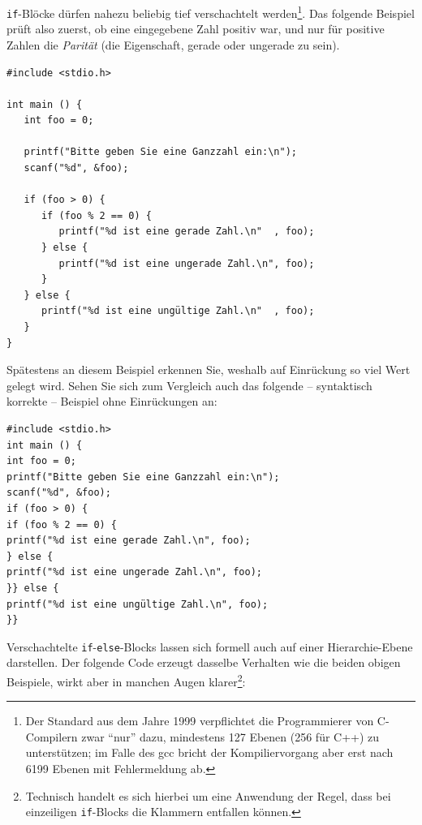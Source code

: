 \texttt{if}-Blöcke dürfen nahezu beliebig tief verschachtelt werden\footnote{Der Standard aus dem Jahre 1999 verpflichtet die Programmierer von C-Compilern zwar \enquote{nur} dazu, mindestens 127 Ebenen (256 für C++) zu unterstützen; im Falle des gcc bricht der Kompiliervorgang aber erst nach 6199 Ebenen mit Fehlermeldung ab.}. Das folgende Beispiel prüft also zuerst, ob eine eingegebene Zahl positiv war, und nur für positive Zahlen die \emph{Parität} (die Eigenschaft, gerade oder ungerade zu sein).

\begin{codebox}
\begin{verbatim}
#include <stdio.h>

int main () {
   int foo = 0;
   
   printf("Bitte geben Sie eine Ganzzahl ein:\n");
   scanf("%d", &foo);

   if (foo > 0) {
      if (foo % 2 == 0) {
         printf("%d ist eine gerade Zahl.\n"  , foo);
      } else {
         printf("%d ist eine ungerade Zahl.\n", foo);
      }
   } else {
      printf("%d ist eine ungültige Zahl.\n"  , foo);
   }
}
\end{verbatim}
\end{codebox}

Spätestens an diesem Beispiel erkennen Sie, weshalb auf Einrückung so viel Wert gelegt wird. Sehen Sie sich zum Vergleich auch das folgende -- syntaktisch korrekte -- Beispiel ohne Einrückungen an:

\begin{warnbox}[Schlechter Stil: Code mit mehreren Hierarchie-Ebenen ohne Einrückungen, leftupper=7mm]
\begin{verbatim}
#include <stdio.h>
int main () {
int foo = 0;
printf("Bitte geben Sie eine Ganzzahl ein:\n");
scanf("%d", &foo);
if (foo > 0) {
if (foo % 2 == 0) {
printf("%d ist eine gerade Zahl.\n", foo);
} else {
printf("%d ist eine ungerade Zahl.\n", foo);
}} else {
printf("%d ist eine ungültige Zahl.\n", foo);
}}
\end{verbatim}
\end{warnbox}

Verschachtelte \texttt{if}-\texttt{else}-Blocks lassen sich formell auch auf einer Hierarchie-Ebene darstellen. Der folgende Code erzeugt dasselbe Verhalten wie die beiden obigen Beispiele, wirkt aber in manchen Augen klarer\footnote{Technisch handelt es sich hierbei um eine Anwendung der Regel, dass bei einzeiligen \texttt{if}-Blocks die Klammern entfallen können.}:


